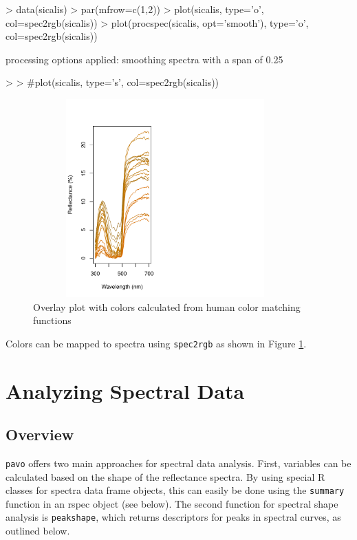 \documentclass{article}
\newcommand{\pavo}{{\tt pavo}}  %
\newcommand{\code}[1]{{\tt #1}}  %
\begin{document}
\begin{Schunk}
\begin{Sinput}
> data(sicalis)
> par(mfrow=c(1,2))
> plot(sicalis, type='o', col=spec2rgb(sicalis))
> plot(procspec(sicalis, opt='smooth'), type='o', col=spec2rgb(sicalis))
\end{Sinput}
\begin{Soutput}
processing options applied:
 smoothing spectra with a span of 0.25 
\end{Soutput}
\begin{Sinput}
> 
> #plot(sicalis, type='s', col=spec2rgb(sicalis))
\end{Sinput}
\end{Schunk}



\begin{figure} %
\begin{center}
\includegraphics[width=4in, height=3in]{pavo-overlay}
\end{center}
\caption{Overlay plot with colors calculated from human color matching functions}
\label{figure:overlay}
\end{figure}

Colors can be mapped to spectra using \code{spec2rgb} as shown in 
Figure \ref{figure:overlay}.


\section{Analyzing Spectral Data}

\subsection{Overview}

\pavo{} offers two main approaches for spectral data analysis. First, variables can be 
calculated based on the shape of the reflectance spectra. By using special R classes for spectra 
data frame objects, this can easily be done using the \code{summary} function in an rspec 
object (see below). The second function for spectral shape analysis is \code{peakshape}, which 
returns descriptors for peaks in spectral curves, as outlined below.
\end{document}
